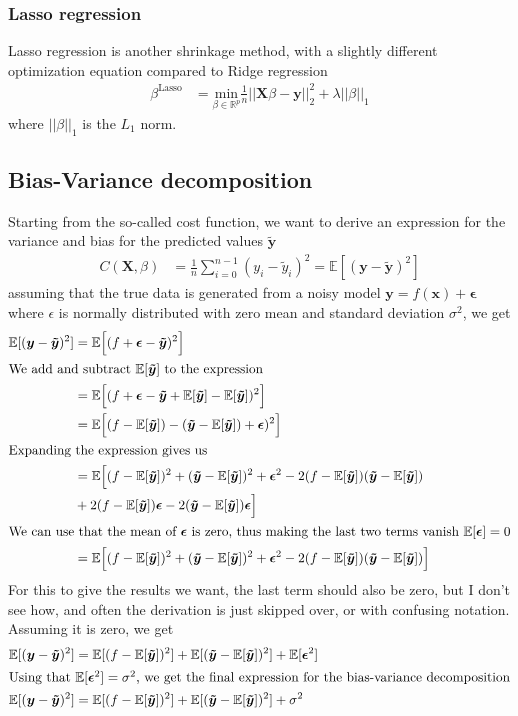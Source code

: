 \documentclass[a4paper]{article}
\newcommand{\XX}{\mathbf{X}}
\newcommand{\Ey}{\mathbb{E}[\bm{\tilde y}]}
\newcommand{\ee}{\bm{\epsilon}}
\newcommand{\yy}{\bm{\tilde y}}
\begin{document}
\subsubsection{Lasso regression}
Lasso regression is another shrinkage method, with a slightly different optimization equation compared to Ridge regression
\begin{align*}
	\beta^{\text{Lasso}} &= \underset{\beta\in \mathbb{R}^{p}}{\text{min}}\frac{1}{n}||\bm{X}\beta - \bm{y}||^2_2 + \lambda||\beta||_1
\end{align*}
where $||\beta||_1$ is the $L_{1}$ norm.
\subsection{Bias-Variance decomposition}
Starting from the so-called cost function, we want to derive an expression for the variance and bias for the predicted values $\bm{\tilde y}$
\begin{align*}
	C(\XX, \beta) &= \frac{1}{n}\sum_{i=0}^{n-1}(y_i-\tilde y_i)^2 = \mathbb{E}[(\bm{y}-\bm{\tilde y})^2]
\end{align*}
assuming that the true data is generated from a noisy model $\bm{y} = f(\bm{x})+\bm{\epsilon}$ where $\epsilon$ is normally distributed with zero mean and standard deviation $\sigma^2$, we get
\begin{align*}
\mathbb{E}[(\bm{y}-\bm{\tilde y})^2] &= \mathbb{E}\Big[(f+\ee - \yy)^2\Big]\\
\intertext{We add and subtract $\Ey$ to the expression}
&= \mathbb{E}\Big[(f + \ee - \yy + \Ey - \Ey)^2\Big]\\
&= \mathbb{E}\Big[(f-\Ey) - (\yy - \Ey) + \ee)^2\Big]\\
\intertext{Expanding the expression gives us}
&= \mathbb{E}\Big[(f-\Ey)^2 + (\yy-\Ey)^2 + \ee^2 - 2(f-\Ey)(\yy-\Ey) \\
&+ 2(f-\Ey)\ee - 2(\yy-\Ey)\ee \Big]\\
\intertext{We can use that the mean of $\ee$ is zero, thus making the last two terms vanish $\mathbb{E}[\ee] = 0$}
&= \mathbb{E}\Big[(f-\Ey)^2 + (\yy-\Ey)^2 + \ee^2 - 2(f-\Ey)(\yy-\Ey) \Big]
\end{align*}
For this to give the results we want, the last term should also be zero, but I don't see how, and often the derivation is just skipped over, or with confusing notation. Assuming it is zero, we get
\begin{align*}
\mathbb{E}[(\bm{y}-\bm{\tilde y})^2] &= \mathbb{E}[(f-\Ey)^2] + \mathbb{E}[(\yy-\Ey)^2] + \mathbb{E}[\ee^2]\\
\intertext{Using that $\mathbb{E}[\ee^2] = \sigma^2$, we get the final expression for the bias-variance decomposition}
\mathbb{E}[(\bm{y}-\bm{\tilde y})^2] &= \mathbb{E}[(f-\Ey)^2] + \mathbb{E}[(\yy-\Ey)^2] + \sigma^2\\
\end{align*}
\end{document}
